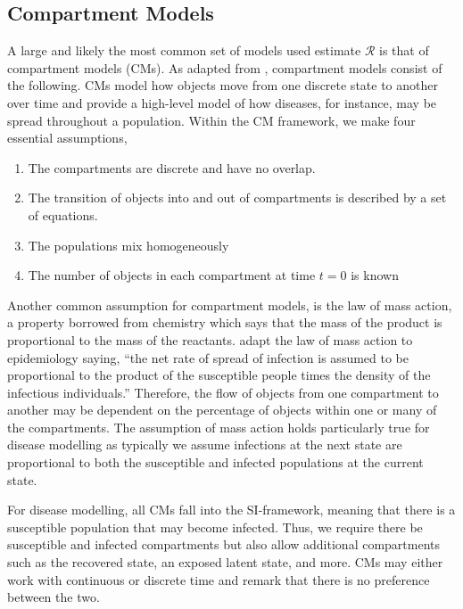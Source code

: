\documentclass[12pt]{article}
\begin{document}



\subsection{Compartment Models}
\label{sec:cms}

A large and likely the most common set of models used estimate $\mathcal{R}$ is that of compartment models (CMs).  As adapted from \cite{daley2001epidemic}, compartment models consist of the following.  CMs model how objects move from one discrete state to another over time and provide a high-level model of how diseases, for instance, may be spread throughout a population.  Within the CM framework, we make four essential assumptions,
\begin{enumerate}
\item The compartments are discrete and have no overlap.
\item The transition of objects into and out of compartments is described by a set of equations.
\item The populations mix homogeneously
  \item The number of objects in each compartment at time $t=0$ is known
  \end{enumerate}  


Another common assumption for compartment models, is the law of mass action, a property borrowed from chemistry which says that the mass of the product is proportional to the mass of the reactants.  \cite{anderson1992} adapt the law of mass action to epidemiology saying, ``the net rate of spread of infection is assumed to be proportional to the product of the susceptible people times the density of the infectious individuals.''  Therefore, the flow of objects from one compartment to another may be dependent on the percentage of objects within one or many of the compartments.  The assumption of mass action holds particularly true for disease modelling as typically we assume infections at the next state are proportional to both the susceptible and infected populations at the current state.

For disease modelling, all CMs fall into the SI-framework, meaning that there is a susceptible population that may become infected.  Thus, we require there be susceptible and infected compartments but also allow additional compartments such as the recovered state, an exposed latent state, and more.  CMs may either work with continuous or discrete time and \cite{getz2006} remark that there is no preference between the two.
\end{document}
